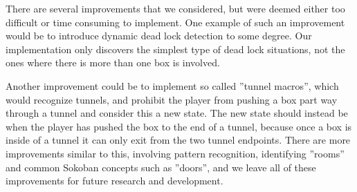\documentclass[a4paper,11pt]{article}
\begin{document}
There are several improvements that we considered, but were
deemed either too difficult or time consuming to implement.
One example of such an improvement would be to introduce dynamic
dead lock detection to some degree.
Our implementation only discovers the simplest type of dead lock situations,
not the ones where there is more than one box is involved.

Another improvement could be to implement so called ''tunnel macros'',
which would recognize tunnels, and prohibit the player
from pushing a box part way through a tunnel and consider this a new state.
The new state should instead be when the player has pushed the box to the end of a tunnel,
because once a box is inside of a tunnel it can only exit from the two tunnel endpoints.
There are more improvements similar to this, involving pattern recognition,
identifying ''rooms'' and common Sokoban concepts such as ''doors'',
and we leave all of these improvements for future research and development.
\end{document}
